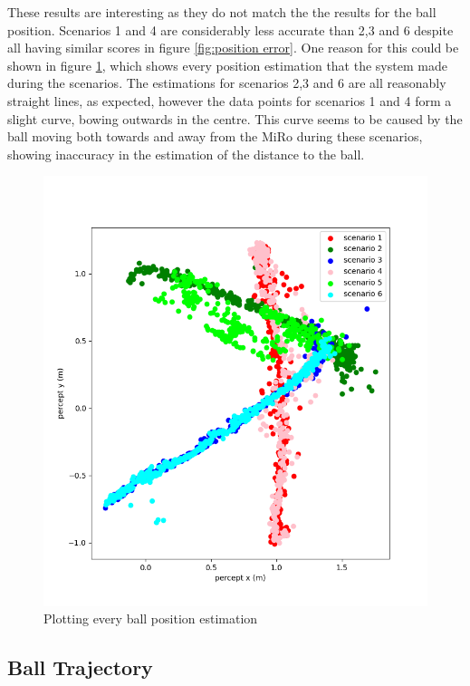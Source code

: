 These results are interesting as they do not match the the results for the ball position. Scenarios 1 and 4 are considerably less accurate than 2,3 and 6 despite all having similar scores in figure \ref{fig:position error}. One reason for this could be shown in figure \ref{figure: x vs y}, which shows every position estimation that the system made during the scenarios. The estimations for scenarios 2,3 and 6 are all reasonably straight lines, as expected, however the data points for scenarios 1 and 4 form a slight curve, bowing outwards in the centre. This curve seems to be caused by the ball moving both towards and away from the MiRo during these scenarios, showing inaccuracy in the estimation of the distance to the ball. 

\begin{figure}[H]
    \centering
    \includegraphics[width=15cm]{images/x_y.png}
    \caption{Plotting every ball position estimation}
    \label{figure: x vs y}
\end{figure}

\subsection{Ball Trajectory}
\label{section: trajectory results}


